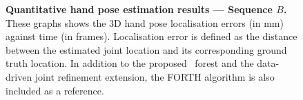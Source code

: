 \begin{figure}[ht]
	\centering
	\caption{\textbf{Quantitative hand pose estimation results --- Sequence $B$.} 
	These graphs shows the 3D hand pose localisation errors (in mm) against time (in frames). Localisation error is defined as the distance between the estimated joint location and its corresponding ground truth location. In addition to the proposed \STR\ forest and the data-driven joint refinement extension, the FORTH algorithm \cite{Oikonomidis2011} is also included as a reference.}
	\label{fig/hand/multiquantb}
\end{figure}

